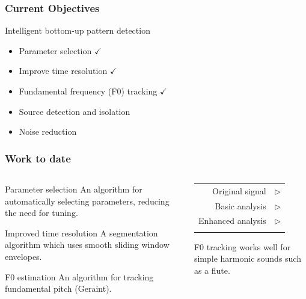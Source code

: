 \begin{frame}
\frametitle{Current Objectives}
	\begin{block}{Intelligent bottom-up pattern detection}
		\begin{itemize}
			\item Parameter selection $\checkmark$
			\item Improve time resolution $\checkmark$
			\item Fundamental frequency (F0) tracking $\checkmark$
			\item Source detection and isolation
			\item Noise reduction
		\end{itemize}
	\end{block}
\end{frame}

\begin{frame}
\frametitle{Work to date}
	\begin{columns}
		\begin{column}{0.5\textwidth}
			\begin{block}{Parameter selection \checkmark}	
				An algorithm for automatically selecting parameters, reducing the need for tuning.
			\end{block}
			\begin{block}{Improved time resolution \checkmark}
				A segmentation algorithm which uses smooth sliding window envelopes.
			\end{block}
			\begin{block}{F0 estimation \checkmark}
				An algorithm for tracking fundamental pitch (Geraint).
			\end{block}
		\end{column}
		\begin{column}{0.5\textwidth}
			\begin{tabular}{r l}
				Original signal & $\rhd$ \\
				Basic analysis & $\rhd$  \\ 
				Enhanced analysis & $\rhd$ \\
				& \\
			\end{tabular} 
			\par \scriptsize{F0 tracking works well for simple harmonic sounds such as a flute.} 

\end{column}
\end{columns}
\end{frame}
